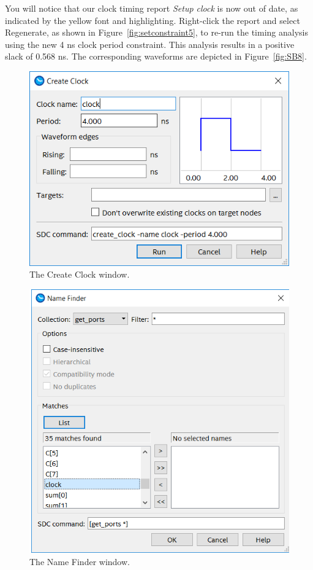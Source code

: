 \documentclass[11pt, twoside, pdftex]{article}
\begin{document}
You will notice that our clock timing report {\it Setup clock} is now out of date, as indicated by the yellow
font and highlighting. Right-click the report and select {\sf Regenerate}, as shown in 
Figure~\ref{fig:setconstraint5}, to re-run the timing analysis using the new 4 ns clock period constraint. 
This analysis results in a positive slack of 0.568 ns. The corresponding waveforms are depicted in 
Figure~\ref{fig:SB8}. 

\begin{figure}[H]
\begin{center}
\includegraphics[scale=0.55]{figures/setconstraint1.png}
\end{center}
\caption{The Create Clock window.}
\label{fig:setconstraint1}
\end{figure}

\begin{figure}[H]
\begin{center}
\includegraphics[scale=0.55]{figures/setconstraint2.png}
\end{center}
\caption{The Name Finder window.}
\label{fig:setconstraint2}
\end{figure}
\end{document}
